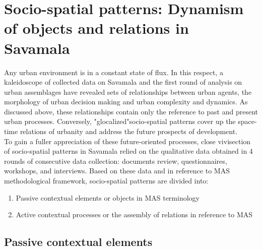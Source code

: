 \documentclass[11pt]{report}
\begin{document}
\section{Socio-spatial patterns: Dynamism of objects and relations in Savamala}

Any urban environment is in a constant state of flux.
In this respect, a kaleidoscope of collected data on Savamala and the first round of analysis on urban assemblages have revealed sets of relationships between urban agents, the morphology of urban decision making and urban complexity and dynamics.
As discussed above, these relationships contain only the reference to past and present urban processes.
Conversely, "glocalized"\footnotemark socio-spatial patterns cover up the space-time relations of urbanity and address the future prospects of development.
\\
To gain a fuller appreciation of these future-oriented processes, close vivisection of socio-spatial patterns in Savamala relied on the qualitative data obtained in 4 rounds of consecutive data collection: documents review, questionnaires, workshops, and interviews.
Based on these data and in reference to MAS methodological framework, socio-spatial patterns are divided into:
\begin{enumerate}
\item Passive contextual elements or objects in MAS terminology
\item Active contextual processes or the assembly of relations in reference to MAS
\end{enumerate}

\subsection{Passive contextual elements}
\end{document}
